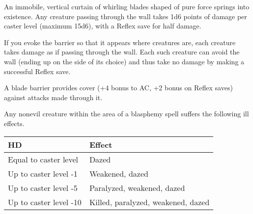 \begin{multicols}{2}
\begin{small}

\noindent An immobile, vertical curtain of whirling blades shaped of pure force springs into existence. Any creature passing through the wall takes 1d6 points of damage per caster level (maximum 15d6), with a Reflex save for half damage.

\smallskip\noindent If you evoke the barrier so that it appears where creatures are, each creature takes damage as if passing through the wall. Each such creature can avoid the wall (ending up on the side of its choice) and thus take no damage by making a successful Reflex save.

\smallskip\noindent A blade barrier provides cover (+4 bonus to AC, +2 bonus on Reflex saves) against attacks made through it.

\noindent Any nonevil creature within the area of a blasphemy spell suffers the following ill effects.

\begin{center}
\begin{tabular}[h!]{l|p{1.7in}}
HD & Effect \\ \hline
Equal to caster level & Dazed \\
Up to caster level -1 & Weakened, dazed \\
Up to caster level -5 & Paralyzed, weakened, dazed \\
Up to caster level -10 & Killed, paralyzed, weakened, dazed \\
\end{tabular}
\end{center}


\end{small}
\end{multicols}
